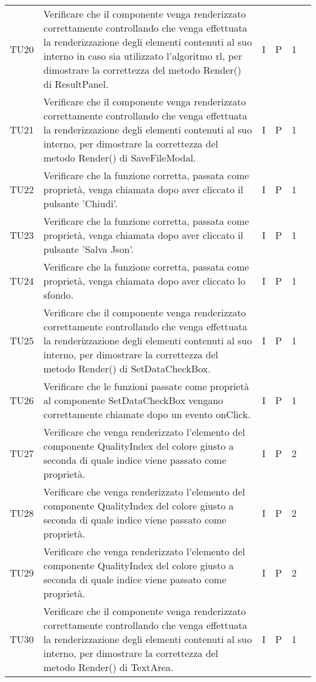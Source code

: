 \begin{longtable} {
		>{}p{12mm}
		>{}p{79.5mm}
		>{}p{9mm}
		>{}p{8mm}
		>{}p{14mm}
		>{}p{0mm}}
	TU20		& Verificare che il componente venga renderizzato correttamente controllando che venga effettuata la renderizzazione degli elementi contenuti al suo interno in caso sia utilizzato l'algoritmo rl, per dimostrare la correttezza del metodo Render() di ResultPanel. & I & P & 1 & \TBstrut \\ [2mm]
	TU21		& Verificare che il componente venga renderizzato correttamente controllando che venga effettuata la renderizzazione degli elementi contenuti al suo interno, per dimostrare la correttezza del metodo Render() di SaveFileModal. & I & P & 1 & \TBstrut \\ [2mm]
	TU22		& Verificare che la funzione corretta, passata come proprietà, venga chiamata dopo aver cliccato il pulsante 'Chiudi'. & I & P & 1 & \TBstrut \\ [2mm]
	TU23		& Verificare che la funzione corretta, passata come proprietà, venga chiamata dopo aver cliccato il pulsante 'Salva Json'. & I & P & 1 & \TBstrut \\ [2mm]
	TU24		& Verificare che la funzione corretta, passata come proprietà, venga chiamata dopo aver cliccato lo sfondo. & I & P & 1 & \TBstrut \\ [2mm]
	TU25		& Verificare che il componente venga renderizzato correttamente controllando che venga effettuata la renderizzazione degli elementi contenuti al suo interno, per dimostrare la correttezza del metodo Render() di SetDataCheckBox. & I & P & 1 & \TBstrut \\ [2mm]
	TU26		& Verificare che le funzioni passate come proprietà al componente SetDataCheckBox vengano correttamente chiamate dopo un evento onClick. & I & P & 1 & \TBstrut \\ [2mm]	
	TU27		& Verificare che venga renderizzato l'elemento del componente QualityIndex del colore giusto a seconda di quale indice viene passato come proprietà. & I & P & 2 & \TBstrut \\ [2mm]
	TU28		& Verificare che venga renderizzato l'elemento del componente QualityIndex del colore giusto a seconda di quale indice viene passato come proprietà. & I & P & 2 & \TBstrut \\ [2mm]
	TU29		& Verificare che venga renderizzato l'elemento del componente QualityIndex del colore giusto a seconda di quale indice viene passato come proprietà. & I & P & 2 & \TBstrut \\ [2mm]
	TU30		& Verificare che il componente venga renderizzato correttamente controllando che venga effettuata la renderizzazione degli elementi contenuti al suo interno, per dimostrare la correttezza del metodo Render() di TextArea. & I & P & 1 & \TBstrut \\ [2mm]

\end{longtable}
